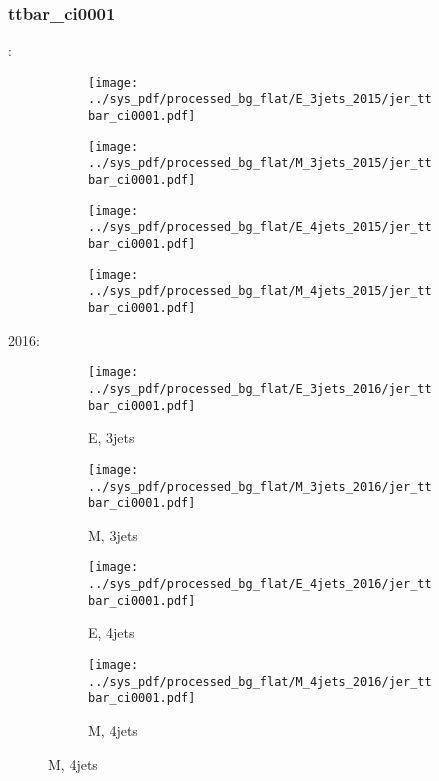 \documentclass{beamer}
\begin{document}
\begin{frame}
\frametitle{ttbar_ci0001}
\fontsize{5}{1}:
\begin{figure}
\centering
\begin{subfigure}[b]{0.24\textwidth}
\texttt{[image: ../sys\_pdf/processed\_bg\_flat/E\_3jets\_2015/jer\_ttbar\_ci0001.pdf]}
\end{subfigure}
\begin{subfigure}[b]{0.24\textwidth}
\texttt{[image: ../sys\_pdf/processed\_bg\_flat/M\_3jets\_2015/jer\_ttbar\_ci0001.pdf]}
\end{subfigure}
\begin{subfigure}[b]{0.24\textwidth}
\texttt{[image: ../sys\_pdf/processed\_bg\_flat/E\_4jets\_2015/jer\_ttbar\_ci0001.pdf]}
\end{subfigure}
\begin{subfigure}[b]{0.24\textwidth}
\texttt{[image: ../sys\_pdf/processed\_bg\_flat/M\_4jets\_2015/jer\_ttbar\_ci0001.pdf]}
\end{subfigure}
\end{figure}
2016:
\begin{figure}
\centering
\begin{subfigure}[b]{0.24\textwidth}
\texttt{[image: ../sys\_pdf/processed\_bg\_flat/E\_3jets\_2016/jer\_ttbar\_ci0001.pdf]}
\captionsetup{font=tiny}
\caption{E, 3jets}
\end{subfigure}
\begin{subfigure}[b]{0.24\textwidth}
\texttt{[image: ../sys\_pdf/processed\_bg\_flat/M\_3jets\_2016/jer\_ttbar\_ci0001.pdf]}
\captionsetup{font=tiny}
\caption{M, 3jets}
\end{subfigure}
\begin{subfigure}[b]{0.24\textwidth}
\texttt{[image: ../sys\_pdf/processed\_bg\_flat/E\_4jets\_2016/jer\_ttbar\_ci0001.pdf]}
\captionsetup{font=tiny}
\caption{E, 4jets}
\end{subfigure}
\begin{subfigure}[b]{0.24\textwidth}
\texttt{[image: ../sys\_pdf/processed\_bg\_flat/M\_4jets\_2016/jer\_ttbar\_ci0001.pdf]}
\captionsetup{font=tiny}
\caption{M, 4jets}
\end{subfigure}
\end{figure}
\end{frame}
\end{document}
